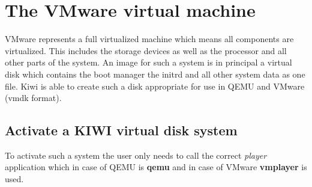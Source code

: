 \section{The VMware virtual machine}
VMware represents a full virtualized machine which means all components
are virtualized. This includes the storage devices as well as the
processor and all other parts of the system. An image for such a system
is in principal a virtual disk which contains the boot manager the
initrd and all other system data as one file. Kiwi is able to create
such a disk appropriate for use in QEMU and VMware (vmdk format).

\subsection{Activate a KIWI virtual disk system}
To activate such a system the user only needs to call the correct
\textit{player} application which in case of QEMU is \textbf{qemu} and
in case of VMware \textbf{vmplayer} is used.
